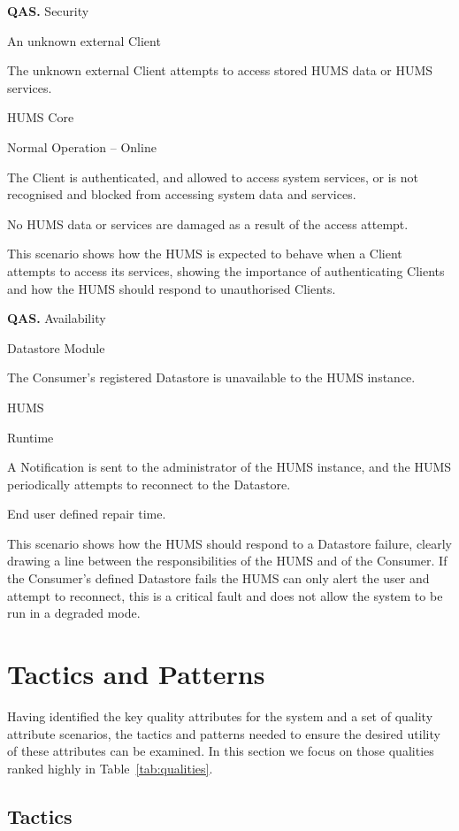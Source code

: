 \documentclass[10pt,a4paper]{article}
\newcommand{\qas}[1]{\textcolor{reqColor}{\textbf{QAS.#1}}}
\newenvironment{scenario}[1]{
\newcommand{\source}[1]{\item[Source of Stimulus:] ##1}
\newcommand{\stimulus}[1]{\item[Stimulus:] ##1}
\newcommand{\artifact}[1]{\item[Artifact:] ##1}
\newcommand{\environment}[1]{\item[Environment:] ##1}
\newcommand{\response}[1]{\item[Response:] ##1}
\newcommand{\measure}[1]{\item[Response Measure:] ##1}
\newcommand{\rationale}[1]{\item[Scenario Rationale:] ##1}
\newcommand{\quality}[1]{\item[Quality:] ##1}
		\begin{description} [noitemsep]	
		\item[Scenario ID:] \qas{#1}
		}{\end{description} \vspace*{0.3cm}
		}
\begin{document}
\begin{scenario}{3}
\quality{Security}
\source{An unknown external Client}
\stimulus{The unknown external Client attempts to access stored HUMS data or HUMS services.}
\artifact{HUMS Core}
\environment{Normal Operation -- Online}
\response{The Client is authenticated, and allowed to access system services, or is not recognised and blocked from accessing system data and services.}
\measure{No HUMS data or services are damaged as a result of the access attempt.}
\rationale{This scenario shows how the HUMS is expected to behave when a Client attempts to access its services, showing the importance of authenticating Clients and how the HUMS should respond to unauthorised Clients.}
\end{scenario}

\begin{scenario}{4}
\quality{Availability}
\source{Datastore Module}
\stimulus{The Consumer's registered Datastore is unavailable to the HUMS instance.}
\artifact{HUMS}
\environment{Runtime}
\response{A Notification is sent to the administrator of the HUMS instance, and the HUMS periodically attempts to reconnect to the Datastore.}
\measure{End user defined repair time.}
\rationale{This scenario shows how the HUMS should respond to a Datastore failure, clearly drawing a line between the responsibilities of the HUMS and of the Consumer. If the Consumer's defined Datastore fails the HUMS can only alert the user and attempt to reconnect, this is a critical fault and does not allow the system to be run in a degraded mode.}
\end{scenario}

\section{Tactics and Patterns}
\label{sec:tactics}
Having identified the key quality attributes for the system and a set of quality attribute scenarios, the tactics and patterns needed to ensure the desired utility of these attributes can be examined. In this section we focus on those qualities ranked highly in Table~\ref{tab:qualities}.

\subsection{Tactics}
\end{document}
